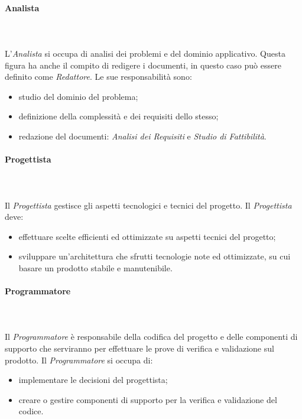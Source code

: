 \paragraph{Analista}\mbox{} \\ \mbox{} \\
L'\textit{Analista} si occupa di analisi dei problemi e del dominio applicativo. Questa figura ha anche il compito di redigere i documenti, in questo caso può essere definito come \textit{Redattore}.
Le sue responsabilità sono:
\begin{itemize}
	\item studio del dominio del problema;
	\item definizione della complessità e dei requisiti dello stesso;
	\item redazione del documenti:\textit{ Analisi dei Requisiti} e \textit{Studio di Fattibilità}.
\end{itemize}

\paragraph{Progettista}\mbox{} \\ \mbox{} \\
Il \textit{Progettista} gestisce gli aspetti tecnologici e tecnici del progetto.
Il \textit{Progettista} deve:
\begin{itemize}
	\item effettuare scelte efficienti ed ottimizzate su aspetti tecnici del progetto;
	\item sviluppare un'architettura che sfrutti tecnologie note ed ottimizzate, su cui basare un prodotto stabile e manutenibile.
\end{itemize}

\paragraph{Programmatore}\mbox{} \\ \mbox{} \\
Il \textit{Programmatore} è responsabile della codifica del progetto e delle componenti di supporto che serviranno per effettuare le prove di verifica e validazione sul prodotto.
Il \textit{Programmatore} si occupa di:
\begin{itemize}
	\item implementare le decisioni del progettista;
	\item creare o gestire componenti di supporto per la verifica e validazione del codice.
\end{itemize}

